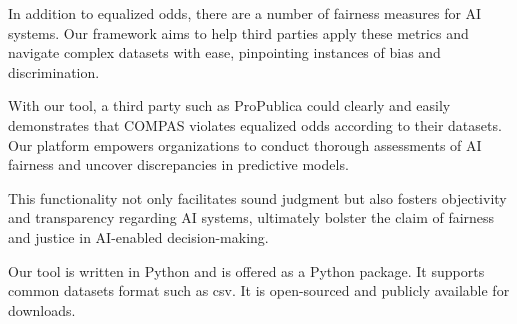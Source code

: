 \documentclass[conference]{IEEEtran}
\begin{document}
In addition to equalized odds, there are a number of fairness measures for AI systems. Our framework aims to help third parties apply these metrics and navigate complex datasets with ease, pinpointing instances of bias and discrimination.

With our tool, a third party such as ProPublica could clearly and easily demonstrates that COMPAS violates equalized odds according to their datasets. Our platform empowers organizations to conduct thorough assessments of AI fairness and uncover discrepancies in predictive models.

This functionality not only facilitates sound judgment but also fosters objectivity and transparency regarding AI systems, ultimately bolster the claim of fairness and justice in AI-enabled decision-making.

Our tool is written in Python and is offered as a Python package. It supports common datasets format such as csv. It is open-sourced and publicly available for downloads.
\end{document}
